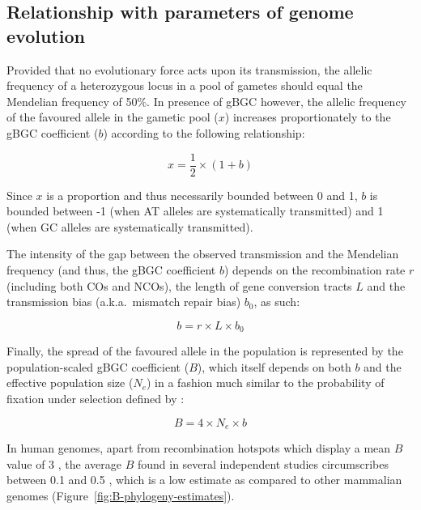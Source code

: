 \subsection{Relationship with parameters of genome evolution}

Provided that no evolutionary force acts upon its transmission, the allelic frequency of a heterozygous locus in a pool of gametes should equal the Mendelian frequency of 50\%.
In presence of gBGC however, the allelic frequency of the favoured allele in the gametic pool ($x$) increases proportionately to the gBGC coefficient ($b$) according to the following relationship:

\begin{equation*}
	x = \frac{1}{2} \times (1+b)
\end{equation*}

Since $x$ is a proportion and thus necessarily bounded between 0 and 1, $b$ is bounded between -1 (when AT alleles are systematically transmitted) and 1 (when GC alleles are systematically transmitted).

The intensity of the gap between the observed transmission and the Mendelian frequency (and thus, the gBGC coefficient $b$) depends on the recombination rate $r$ (including both COs and NCOs), the length of gene conversion tracts $L$ and the transmission bias (a.k.a.\ mismatch repair bias) $b_0$, as such: 

\begin{equation*}
	b = r \times L \times b_0
\end{equation*}

Finally, the spread of the favoured allele in the population is represented by the population-scaled gBGC coefficient ($B$), which itself depends on both $b$ and the effective population size ($N_e$) in a fashion much similar to the probability of fixation under selection defined by \citet{kimura1962probability}:

\begin{equation*}
	B = 4 \times N_e \times b
\end{equation*}


In human genomes, apart from recombination hotspots which display a mean $B$ value of 3 \citep{glemin2015quantification}, the average $B$ found in several independent studies circumscribes between 0.1 and 0.5 \citep{lartillot2013phylogenetic,demaio2013linking,glemin2015quantification}, which is a low estimate as compared to other mammalian genomes \citep{lartillot2013phylogenetic} (Figure~\ref{fig:B-phylogeny-estimates}).\\


